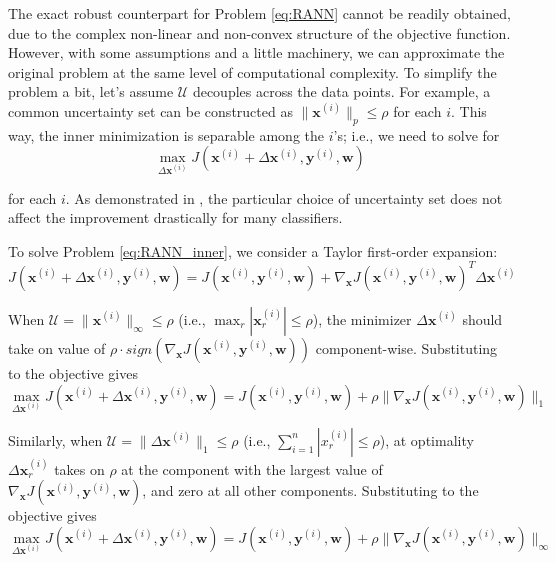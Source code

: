 \documentclass[twoside,12pt]{article}
\newcommand{\M}[1]{\boldsymbol{\mathbf{#1}}}
\newcommand{\Cal}{\mathcal}
\begin{document}
The exact robust counterpart for Problem \eqref{eq:RANN} cannot be readily obtained, due to the complex non-linear and non-convex structure of the objective function. However, with some assumptions and a little machinery, we can approximate the original problem at the same level of computational complexity. To simplify the problem a bit, let's assume $\Cal U$ decouples across the data points. For example, a common uncertainty set can be constructed as $\| \M x^{(i)} \|_p \leq \rho$ for each $i$. This way, the inner minimization is separable among the $i$'s; i.e., we need to solve for 
\begin{equation}\label{eq:RANN_inner}
\max_{\Delta \M x^{(i)}}  J(\M x^{(i)} + \Delta \M x^{(i)}, \M y^{(i)}, \M w)
\end{equation}

for each $i$. As demonstrated in \cite{bertsimas2015robust}, the particular choice of uncertainty set does not affect the improvement drastically for many classifiers.

To solve Problem \eqref{eq:RANN_inner}, we consider a Taylor first-order expansion:
\begin{equation}\label{eq:RANN_taylor}
J(\M x^{(i)} + \Delta \M x^{(i)}, \M y^{(i)}, \M w) = J(\M x^{(i)}, \M y^{(i)}, \M w) + \nabla_{\M x} J(\M x^{(i)}, \M y^{(i)}, \M w) ^T \Delta \M x^{(i)}
\end{equation}

When $\Cal U = \| \M x^{(i)} \|_\infty \leq \rho$ (i.e., $\max_r |\M x_r^{(i)}| \leq \rho$), the minimizer $\Delta \M x^{(i)}$ should take on value of $\rho \cdot sign(\nabla_{\M x} J(\M x^{(i)}, \M y^{(i)}, \M w))$ component-wise. Substituting to the objective gives
\begin{equation}\label{eq:RANN_inner_linf}
\max_{\Delta \M x^{(i)}}  J(\M x^{(i)} + \Delta \M x^{(i)}, \M y^{(i)}, \M w) = J(\M x^{(i)}, \M y^{(i)}, \M w) + \rho \| \nabla_{\M x} J(\M x^{(i)}, \M y^{(i)}, \M w) \|_1
\end{equation}

Similarly, when $\Cal U = \| \Delta \M x^{(i)} \|_1 \leq \rho$ (i.e., $\sum_{i=1}^n |x_r^{(i)}| \leq \rho$), at optimality $\Delta \M x_r^{(i)}$ takes on $\rho$ at the component with the largest value of $\nabla_{\M x} J(\M x^{(i)}, \M y^{(i)}, \M w)$, and zero at all other components. Substituting to the objective gives
\begin{equation}\label{eq:RANN_inner_l1}
\max_{\Delta \M x^{(i)}}  J(\M x^{(i)} + \Delta \M x^{(i)}, \M y^{(i)}, \M w) = J(\M x^{(i)}, \M y^{(i)}, \M w) + \rho \| \nabla_{\M x} J(\M x^{(i)}, \M y^{(i)}, \M w) \|_\infty
\end{equation}
\end{document}
